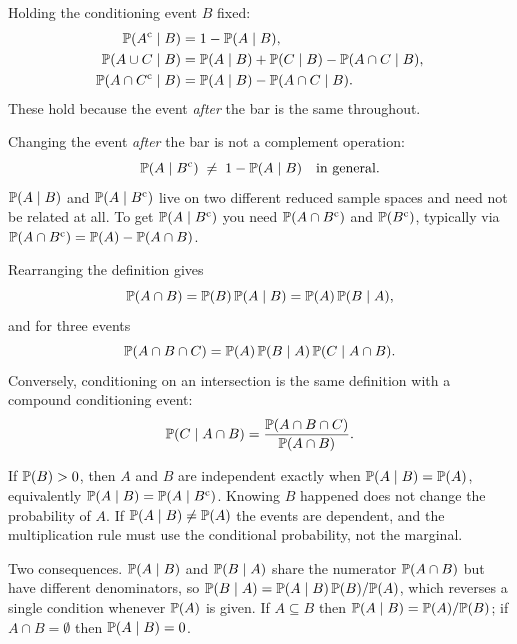 \begin{keyfact}
Holding the conditioning event $B$ fixed:
\begin{align*}
\mathbb{P}(A^{\mathrm{c}} \mid B) &= 1 - \mathbb{P}(A \mid B), \\
\mathbb{P}(A \cup C \mid B) &= \mathbb{P}(A \mid B) + \mathbb{P}(C \mid B) - \mathbb{P}(A \cap C \mid B), \\
\mathbb{P}(A \cap C^{\mathrm{c}} \mid B) &= \mathbb{P}(A \mid B) - \mathbb{P}(A \cap C \mid B).
\end{align*}
These hold because the event \emph{after} the bar is the same throughout.
\end{keyfact}

\begin{keyfact}
Changing the event \emph{after} the bar is not a complement operation:
\[
\mathbb{P}(A \mid B^{\mathrm{c}}) \;\ne\; 1 - \mathbb{P}(A \mid B) \quad \text{in general.}
\]
$\mathbb{P}(A\mid B)$ and $\mathbb{P}(A\mid B^{\mathrm{c}})$ live on two different reduced sample
spaces and need not be related at all. To get $\mathbb{P}(A \mid B^{\mathrm{c}})$ you need
$\mathbb{P}(A \cap B^{\mathrm{c}})$ and $\mathbb{P}(B^{\mathrm{c}})$, typically via
$\mathbb{P}(A \cap B^{\mathrm{c}}) = \mathbb{P}(A) - \mathbb{P}(A \cap B)$.
\end{keyfact}

\begin{keyfact}
Rearranging the definition gives
\[
\mathbb{P}(A \cap B) = \mathbb{P}(B)\,\mathbb{P}(A \mid B) = \mathbb{P}(A)\,\mathbb{P}(B \mid A),
\]
and for three events
\[
\mathbb{P}(A \cap B \cap C) = \mathbb{P}(A)\,\mathbb{P}(B \mid A)\,\mathbb{P}(C \mid A \cap B).
\]
Conversely, conditioning on an intersection is the same definition with a
compound conditioning event:
\[
\mathbb{P}(C \mid A \cap B) = \frac{\mathbb{P}(A \cap B \cap C)}{\mathbb{P}(A \cap B)} .
\]
\end{keyfact}

\begin{keyfact}
If $\mathbb{P}(B) > 0$, then $A$ and $B$ are independent exactly when
$\mathbb{P}(A \mid B) = \mathbb{P}(A)$, equivalently $\mathbb{P}(A \mid B) = \mathbb{P}(A \mid B^{\mathrm{c}})$.
Knowing $B$ happened does not change the probability of $A$. If
$\mathbb{P}(A \mid B) \ne \mathbb{P}(A)$ the events are dependent, and the multiplication
rule must use the conditional probability, not the marginal.
\end{keyfact}

Two consequences. $\mathbb{P}(A \mid B)$ and $\mathbb{P}(B \mid A)$ share the numerator
$\mathbb{P}(A \cap B)$ but have different denominators, so
$\mathbb{P}(B \mid A) = \mathbb{P}(A \mid B)\,\mathbb{P}(B)/\mathbb{P}(A)$, which reverses a single
condition whenever $\mathbb{P}(A)$ is given. If $A \subseteq B$ then
$\mathbb{P}(A \mid B) = \mathbb{P}(A)/\mathbb{P}(B)$; if $A \cap B = \emptyset$ then
$\mathbb{P}(A \mid B) = 0$.

